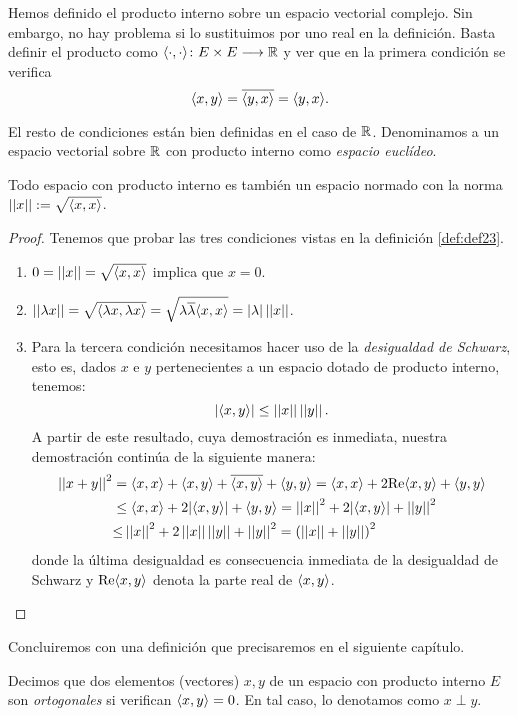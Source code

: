 \begin{observation} Hemos definido el producto interno sobre un espacio vectorial complejo. Sin embargo, no hay problema si lo sustituimos por uno real en la definición. Basta definir el producto como $\langle\cdot,\cdot\rangle\colon E\times E\longrightarrow \mathbb{R}$ y ver que en la primera condición se verifica
\[\langle x,y\rangle=\overline{\langle y,x\rangle}=\langle y,x\rangle.\]

El resto de condiciones están bien definidas en el caso de $\mathbb{R}$. Denominamos a un espacio vectorial sobre $\mathbb{R}$ con producto interno como \textit{espacio euclídeo}.
\end{observation}

\begin{proposition} Todo espacio con producto interno es también un espacio normado con la norma $\left|\left|x\right|\right|:=\sqrt{\langle x,x\rangle}$.
\begin{proof} Tenemos que probar las tres condiciones vistas en la definición \ref{def:def23}.
\begin{enumerate}[label=\alph*)]
\item $0 = \left|\left|x\right|\right| = \sqrt{\langle x,x\rangle}$ implica que $x=0$.
\item $\left|\left|\lambda x\right|\right| = \sqrt{\langle\lambda x,\lambda x\rangle} = \sqrt{\lambda\overline{\lambda}\langle x,x\rangle}=|\lambda|\left|\left|x\right|\right|$.
\item Para la tercera condición necesitamos hacer uso de la \textit{desigualdad de Schwarz}, esto es,  dados $x$ e $y$ pertenecientes a un espacio dotado de producto interno, tenemos:
$$|\langle x,y\rangle|\leq\left|\left|x\right|\right|\left|\left|y\right|\right|.
$$
A partir de este resultado, cuya demostración es inmediata, nuestra demostración continúa de la siguiente manera:
\[
\begin{split}
\norm{x+y}^2 &= \dotproduct{x}{x} + \dotproduct{x}{y} + \overline{\dotproduct{x}{y}} + \dotproduct{y}{y} = \dotproduct{x}{x} + 2\mathrm{Re}\dotproduct{x}{y} + \dotproduct{y}{y}\\
&\leq \dotproduct{x}{x} + 2|\dotproduct{x}{y}| + \dotproduct{y}{y} = \norm{x}^2+ 2|\dotproduct{x}{y}|+\norm{y}^2\\
&%
{\leq}\norm{x}^2+ 2\norm{x}\norm{y}+\norm{y}^2 = \left(\norm{x}+\norm{y}\right)^2
\end{split}
\]
donde la última desigualdad es consecuencia inmediata de la desigualdad de Schwarz y $\mathrm{Re}\langle x,y\rangle$ denota la parte real de $\langle x,y\rangle$.
\end{enumerate}
\end{proof}
\end{proposition}

Concluiremos con una definición que precisaremos en el siguiente capítulo.

\begin{definition} Decimos que dos elementos (vectores) $x,y$ de un espacio con producto interno $E$ son \textit{ortogonales} si verifican $\langle x,y\rangle=0$. En tal caso, lo denotamos como $x\perp y$.
\end{definition}